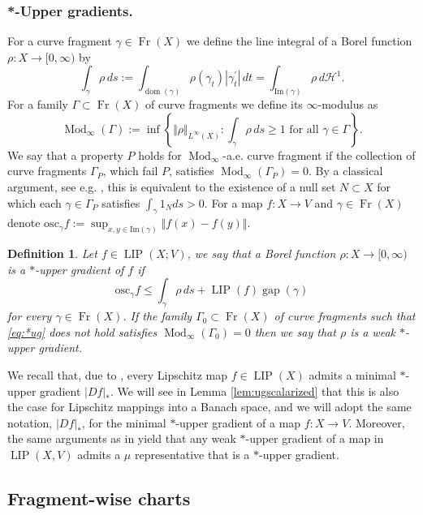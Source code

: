 \documentclass{amsart}
\newtheorem{definition}[theorem]{Definition}
\numberwithin{equation}{section}
\newcommand{\Mod}{\operatorname{Mod}}
\newcommand{\LIP}{\operatorname{LIP}}
\newcommand{\gap}{\operatorname{gap}}
\newcommand{\dom}{\operatorname{dom}}
\newcommand{\Fr}{\operatorname{Fr}}
\begin{document}
\subsubsection*{*-Upper gradients.} For a curve fragment $\gamma\in \Fr (X)$ we define the line integral of a Borel function $\rho :X\rightarrow [0,\infty )$ by
$$\int_\gamma \rho\, ds :=\int_{\dom (\gamma )}\rho (\gamma_t )|\gamma_t^\prime |\, dt=\int_{\mathrm{Im} (\gamma )}\rho\, d\mathcal H^1.$$
For a family $\Gamma\subset \Fr (X)$ of curve fragments we define its $\infty$-modulus as
$$\Mod_\infty (\Gamma ):=\inf\left\{ \Vert \rho\Vert_{L^\infty (X)}:\int_{\gamma}\rho\, ds \geq 1\mbox{ for all }\gamma\in\Gamma \right\}.$$
We say that a property $P$ holds for $\Mod_\infty$-a.e. curve fragment if the collection of curve fragments $\Gamma_P$, which fail $P$, satisfies $\Mod_\infty(\Gamma_P)=0$. By a classical argument, see e.g. \cite[Lemma 2.7]{tsd24}, this is equivalent to the existence of a null set $N\subset X$ for which each $\gamma\in \Gamma_P$ satisfies $\int_\gamma 1_N ds >0$.
For a map $f:X\rightarrow V$ and $\gamma\in\Fr (X)$ denote $\displaystyle \mathrm{osc}_\gamma f:=\sup_{x,y\in \mathrm{Im}(\gamma )}\Vert f(x)-f(y)\Vert $.
\begin{definition}
Let $f\in\LIP (X;V)$, we say that a Borel function $\rho :X\rightarrow [0,\infty )$ is a $*$-upper gradient of $f$ if
\begin{equation}\label{eq:*ug}
\mathrm{osc}_\gamma f\leq \int_\gamma \rho\, ds +\LIP (f)\gap (\gamma )
\end{equation}
for every $\gamma\in \Fr (X)$. If the family $\Gamma_0\subset \Fr (X)$ of curve fragments such that \eqref{eq:*ug} does not hold satisfies $\Mod_\infty (\Gamma_0 )=0$ then we say that $\rho$ is a weak $*$-upper gradient.
\end{definition}
We recall that, due to \cite[Proposition 2.10]{tsd24}, every Lipschitz map $f\in \LIP (X)$ admits a minimal $*$-upper gradient $|Df|_*$. We will see in Lemma \ref{lem:ugscalarized} that this is also the case for Lipschitz mappings into a Banach space, and we will adopt the same notation, $|Df|_*$, for the minimal $*$-upper gradient of a map $f:X\rightarrow V$. Moreover, the same arguments as in \cite[Remark 2.9]{tsd24} yield that any weak $*$-upper gradient of a map in $\LIP (X,V)$ admits a $\mu$ representative that is a $*$-upper gradient.



\subsection{Fragment-wise charts}
\end{document}
